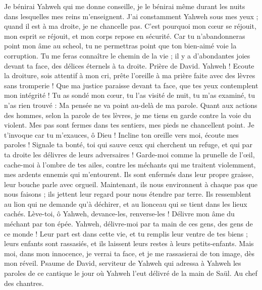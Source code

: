 \begin{multicols}{2}
Je bénirai Yahweh qui me donne conseille, je le bénirai même durant les nuits dans lesquelles mes reins m'enseignent.
J'ai constamment Yahweh sous mes yeux ; quand il est à ma droite, je ne chancelle pas.
C'est pourquoi mon cœur se réjouit, mon esprit se réjouit, et mon corps repose en sécurité.
Car tu n'abandonneras point mon âme au scheol, tu ne permettras point que ton bien-aimé voie la corruption.
Tu me feras connaître le chemin de la vie ; il y a d'abondantes joies devant ta face, des délices éternels à ta droite.
\VerseOne{}Prière de David. Yahweh ! Ecoute la droiture, sois attentif à mon cri, prête l'oreille à ma prière faite avec des lèvres sans tromperie !
Que ma justice paraisse devant ta face, que tes yeux contemplent mon intégrité !
Tu as sondé mon cœur, tu l'as visité de nuit, tu m'as examiné, tu n'as rien trouvé : Ma pensée ne va point au-delà de ma parole.
Quant aux actions des hommes, selon la parole de tes lèvres, je me tiens en garde contre la voie du violent.
Mes pas sont fermes dans tes sentiers, mes pieds ne chancellent point.
Je t'invoque car tu m'exauces, ô Dieu ! Incline ton oreille vers moi, écoute mes paroles !
Signale ta bonté, toi qui sauve ceux qui cherchent un refuge, et qui par ta droite les délivres de leurs adversaires !
Garde-moi comme la prunelle de l'œil, cache-moi à l'ombre de tes ailes,
contre les méchants qui me traitent violemment, mes ardents ennemis qui m'entourent.
Ils sont enfermés dans leur propre graisse, leur bouche parle avec orgueil.
Maintenant, ils nous environnent à chaque pas que nous faisons ; ils jettent leur regard pour nous étendre par terre.
Ils ressemblent au lion qui ne demande qu'à déchirer, et au lionceau qui se tient dans les lieux cachés.
Lève-toi, ô Yahweh, devance-les, renverse-les ! Délivre mon âme du méchant par ton épée.
Yahweh, délivre-moi par ta main de ces gens, des gens de ce monde ! Leur part est dans cette vie, et tu remplis leur ventre de tes biens ; leurs enfants sont rassasiés, et ils laissent leurs restes à leurs petits-enfants.
Mais moi, dans mon innocence, je verrai ta face, et je me rassasierai de ton image, dès mon réveil.
\VerseOne{}Psaume de David, serviteur de Yahweh qui adressa à Yahweh les paroles de ce cantique le jour où Yahweh l'eut délivré de la main de Saül. Au chef des chantres.

\end{multicols}
